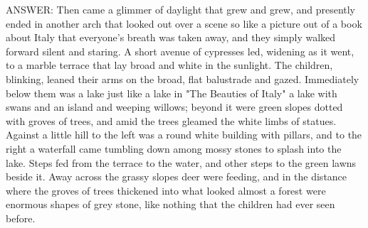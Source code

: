 
    ANSWER:
    Then came a glimmer of daylight that grew and grew, and
    presently ended in another arch that looked out over a scene so like
    a picture out of a book about Italy that everyone's breath was taken
away, and they simply walked forward silent and staring. A short
avenue of cypresses led, widening as it went, to a marble terrace
that lay broad and white in the sunlight. The children, blinking,
leaned their arms on the broad, flat balustrade and gazed.
Immediately below them was a lake just like a lake in "The
Beauties of Italy" a lake with swans and an island and weeping
willows; beyond it were green slopes dotted with groves of trees,
and amid the trees gleamed the white limbs of statues. Against a
little hill to the left was a round white building with pillars, and to
the right a waterfall came tumbling down among mossy stones to
splash into the lake. Steps fed from the terrace to the water, and
other steps to the green lawns beside it. Away across the grassy
slopes deer were feeding, and in the distance where the groves of
trees thickened into what looked almost a forest were enormous
shapes of grey stone, like nothing that the children had ever seen
before.
